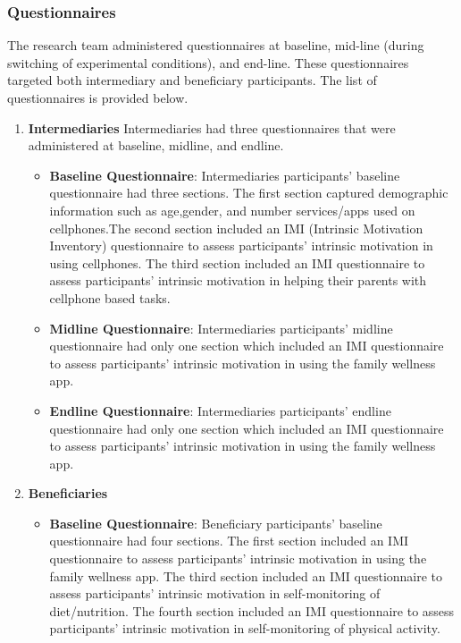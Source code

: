 \subsubsection{Questionnaires}\label{methodsquestionnaire}
The research team administered questionnaires at baseline, mid-line (during switching of experimental conditions), and end-line. These questionnaires targeted both intermediary and beneficiary participants. The list of questionnaires is provided below.
\begin{enumerate}
\item{\textbf{Intermediaries}}
Intermediaries had three questionnaires that were administered at baseline, midline, and endline.
 
\begin{itemize}
\item{\textbf{Baseline Questionnaire}}: Intermediaries participants' baseline questionnaire had three sections. The first section captured demographic information such as age,gender, and number services/apps used on cellphones.The second section included an IMI (Intrinsic Motivation Inventory) questionnaire  to assess participants' intrinsic motivation in using cellphones. The third section included an IMI questionnaire to assess participants' intrinsic motivation in helping their parents with cellphone based tasks. 

\item{\textbf{Midline Questionnaire}}: Intermediaries participants' midline questionnaire had only one section which included an IMI questionnaire  to assess participants' intrinsic motivation in using the family wellness app.

\item{\textbf{Endline Questionnaire}}: Intermediaries participants' endline questionnaire had only one section which included an IMI questionnaire  to assess participants' intrinsic motivation in using the family wellness app.
\end{itemize}

\item{\textbf{Beneficiaries}}

\begin{itemize}
\item{\textbf{Baseline Questionnaire}}: Beneficiary participants' baseline questionnaire had four sections. The first section included an IMI questionnaire  to assess participants' intrinsic motivation in using the family wellness app. The third section included an IMI questionnaire to assess participants' intrinsic motivation in self-monitoring of diet/nutrition. The fourth section included an IMI questionnaire to assess participants' intrinsic motivation in self-monitoring of physical activity.


\end{itemize}
\end{enumerate}
